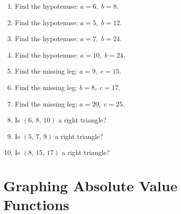\documentclass[11pt]{article}
\begin{document}
\begin{enumerate}[leftmargin=*,label=\textbf{\arabic*.}]
\item Find the hypotenuse: $a=6,\;b=8$.\vspace{1.7cm}
\item Find the hypotenuse: $a=5,\;b=12$.\vspace{1.7cm}
\item Find the hypotenuse: $a=7,\;b=24$.\vspace{1.7cm}
\item Find the hypotenuse: $a=10,\;b=24$.\vspace{1.7cm}
\item Find the missing leg: $a=9,\;c=15$.\vspace{1.7cm}
\item Find the missing leg: $b=8,\;c=17$.\vspace{1.7cm}
\item Find the missing leg: $a=20,\;c=25$.\vspace{1.7cm}
\item Is $(6,\,8,\,10)$ a right triangle?\vspace{1.4cm}
\item Is $(5,\,7,\,9)$ a right triangle?\vspace{1.4cm}
\item Is $(8,\,15,\,17)$ a right triangle?\vspace{1.4cm}
\end{enumerate}

\newpage
\section{Graphing Absolute Value Functions}
\end{document}
